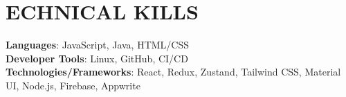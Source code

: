 \documentclass[letterpaper,11pt]{article}
\begin{document}
%
\section{\textrm{\scalebox{1.2}{T}ECHNICAL \scalebox{1.2}{S}KILLS}}

 \begin{itemize}[leftmargin=0.15in, label={}]
    \small{\item{
     \textbf{Languages}{: JavaScript, Java, HTML/CSS} \\
     \textbf{Developer Tools}{: Linux, GitHub, CI/CD} \\
     \textbf{Technologies/Frameworks}{: React, Redux, Zustand, Tailwind CSS, Material UI, Node.js, Firebase, Appwrite} \\
    }}
 \end{itemize}
 \vspace{-16pt}
\end{document}
